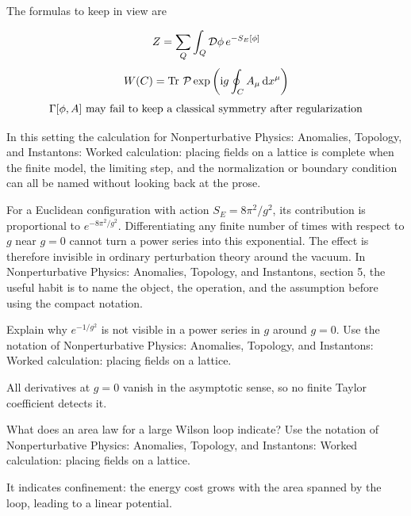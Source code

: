The formulas to keep in view are

\[
  Z=\sum_Q\int_Q\mathcal D\phi\,e^{-S_E[\phi]}
\]
\[
  W(C)=\operatorname{Tr}\,\mathcal P\exp\left(\mathrm i g\oint_C A_\mu\,\mathrm d x^\mu\right)
\]
\[
  \Gamma[\phi,A]\hbox{ may fail to keep a classical symmetry after regularization}
\]

In this setting the calculation for Nonperturbative Physics: Anomalies, Topology, and Instantons: Worked calculation: placing fields on a lattice is complete when the finite model, the limiting step, and the normalization or boundary condition can all be named without looking back at the prose.




\begin{example}
For a Euclidean configuration with action \(S_E=8\pi^2/g^2\), its contribution is proportional to \(e^{-8\pi^2/g^2}\).  Differentiating any finite number of times with respect to \(g\) near \(g=0\) cannot turn a power series into this exponential.  The effect is therefore invisible in ordinary perturbation theory around the vacuum.  In Nonperturbative Physics: Anomalies, Topology, and Instantons, section 5, the useful habit is to name the object, the operation, and the assumption before using the compact notation.
\end{example}



\begin{exercise}
Explain why \(e^{-1/g^2}\) is not visible in a power series in \(g\) around \(g=0\).  Use the notation of Nonperturbative Physics: Anomalies, Topology, and Instantons: Worked calculation: placing fields on a lattice.
\begin{answer}
All derivatives at \(g=0\) vanish in the asymptotic sense, so no finite Taylor coefficient detects it.
\end{answer}
\end{exercise}

\begin{exercise}
What does an area law for a large Wilson loop indicate?  Use the notation of Nonperturbative Physics: Anomalies, Topology, and Instantons: Worked calculation: placing fields on a lattice.
\begin{answer}
It indicates confinement: the energy cost grows with the area spanned by the loop, leading to a linear potential.
\end{answer}
\end{exercise}



